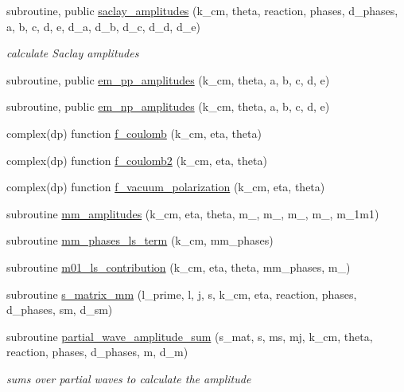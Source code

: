 \begin{DoxyCompactItemize}
\item 
subroutine, public \hyperlink{namespaceamplitudes_a2c13b08b9114f55d796fa0ad76fb1afd}{saclay\+\_\+amplitudes} (k\+\_\+cm, theta, reaction, phases, d\+\_\+phases, a, b, c, d, e, d\+\_\+a, d\+\_\+b, d\+\_\+c, d\+\_\+d, d\+\_\+e)
\begin{DoxyCompactList}\small\item\em calculate Saclay amplitudes \end{DoxyCompactList}\item 
subroutine, public \hyperlink{namespaceamplitudes_aca98c489bfb460150de74e01455194c6}{em\+\_\+pp\+\_\+amplitudes} (k\+\_\+cm, theta, a, b, c, d, e)
\item 
subroutine, public \hyperlink{namespaceamplitudes_a1ecc7462b112cd7709e06658b50bcf68}{em\+\_\+np\+\_\+amplitudes} (k\+\_\+cm, theta, a, b, c, d, e)
\item 
complex(dp) function \hyperlink{namespaceamplitudes_a15d06fdbb253231f6ba809a11be4bc0c}{f\+\_\+coulomb} (k\+\_\+cm, eta, theta)
\item 
complex(dp) function \hyperlink{namespaceamplitudes_a1deb8553133d2a765c200dddc6d4019e}{f\+\_\+coulomb2} (k\+\_\+cm, eta, theta)
\item 
complex(dp) function \hyperlink{namespaceamplitudes_aeefee706538ec9db13783ca6bf39139c}{f\+\_\+vacuum\+\_\+polarization} (k\+\_\+cm, eta, theta)
\item 
subroutine \hyperlink{namespaceamplitudes_a4c67568b324f005039a7a4a10fbfad32}{mm\+\_\+amplitudes} (k\+\_\+cm, eta, theta, m\+\_, m\+\_, m\+\_, m\+\_, m\+\_\+1m1)
\item 
subroutine \hyperlink{namespaceamplitudes_a3b59e51fa3e5cbeac091c86fa86b0005}{mm\+\_\+phases\+\_\+ls\+\_\+term} (k\+\_\+cm, mm\+\_\+phases)
\item 
subroutine \hyperlink{namespaceamplitudes_ac2fb8ddf880b4a5d9dd1d941ee9a9713}{m01\+\_\+ls\+\_\+contribution} (k\+\_\+cm, eta, theta, mm\+\_\+phases, m\+\_)
\item 
subroutine \hyperlink{namespaceamplitudes_aefff90f83f922023f8bd5a617b88fcaa}{s\+\_\+matrix\+\_\+mm} (l\+\_\+prime, l, j, s, k\+\_\+cm, eta, reaction, phases, d\+\_\+phases, sm, d\+\_\+sm)
\item 
subroutine \hyperlink{namespaceamplitudes_ac9837614da738e17c9e58c87af369eef}{partial\+\_\+wave\+\_\+amplitude\+\_\+sum} (s\+\_\+mat, s, ms, mj, k\+\_\+cm, theta, reaction, phases, d\+\_\+phases, m, d\+\_\+m)
\begin{DoxyCompactList}\small\item\em sums over partial waves to calculate the amplitude \end{DoxyCompactList}\item 

\end{DoxyCompactItemize}
